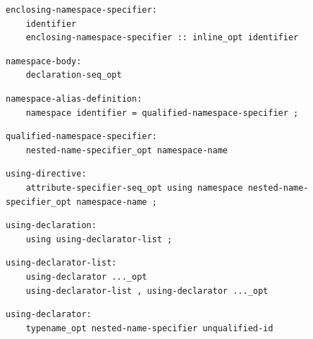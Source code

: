 \noindent\textbf{\texttt{}}\par
\begin{lstlisting}
enclosing-namespace-specifier:
    identifier
    enclosing-namespace-specifier :: inline_opt identifier
\end{lstlisting}

\noindent\textbf{\texttt{}}\par
\begin{lstlisting}
namespace-body:
    declaration-seq_opt
\end{lstlisting}

\noindent\textbf{\texttt{}}\par
\begin{lstlisting}
namespace-alias-definition:
    namespace identifier = qualified-namespace-specifier ;
\end{lstlisting}

\noindent\textbf{\texttt{}}\par
\begin{lstlisting}
qualified-namespace-specifier:
    nested-name-specifier_opt namespace-name
\end{lstlisting}

\noindent\textbf{\texttt{}}\par
\begin{lstlisting}
using-directive:
    attribute-specifier-seq_opt using namespace nested-name-specifier_opt namespace-name ;
\end{lstlisting}

\noindent\textbf{\texttt{}}\par
\begin{lstlisting}
using-declaration:
    using using-declarator-list ;
\end{lstlisting}

\noindent\textbf{\texttt{}}\par
\begin{lstlisting}
using-declarator-list:
    using-declarator ..._opt
    using-declarator-list , using-declarator ..._opt
\end{lstlisting}

\noindent\textbf{\texttt{}}\par
\begin{lstlisting}
using-declarator:
    typename_opt nested-name-specifier unqualified-id
\end{lstlisting}


